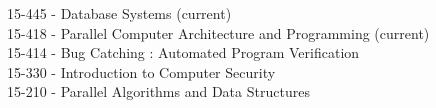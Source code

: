 
\begin{projects}

	\course
	{15-445 -} {Database Systems (current)} \\
	\course
	{15-418 -} {Parallel Computer Architecture and Programming (current)} \\
    \course
    {15-414 -} {Bug Catching : Automated Program Verification} \\
    \course
    {15-330 -} {Introduction to Computer Security} \\
	\course
	{15-210 -} {Parallel Algorithms and Data Structures}

\end{projects}
